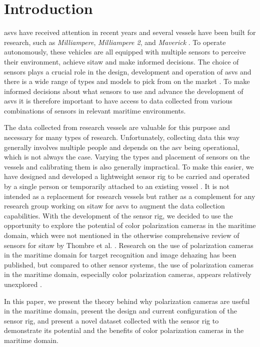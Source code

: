 \section{Introduction}
\glspl{asv} have received attention in recent years and several vessels have been built for research, such as \textit{Milliampere}, \textit{Milliampere 2}, and \textit{Maverick} \cite{brekkeMilliAmpereAutonomousFerry2022}\cite{zhangDesignBuildAutonomous2023}\cite{eideAutonomousUrbanPassengerInReview}.
To operate autonomously, these vehicles are all equipped with multiple sensors to perceive their environment, achieve \gls{sitaw} and make informed decisions.
The choice of sensors plays a crucial role in the design, development and operation of \glspl{asv} and there is a wide range of types and models to pick from on the market \cite{thombreSensorsAITechniques2022}.
To make informed decisions about what sensors to use and advance the development of \glspl{asv} it is therefore important to have access to data collected from various combinations of sensors in relevant maritime environments.

The data collected from research vessels are valuable for this purpose and necessary for many types of research.
Unfortunately, collecting data this way generally involves multiple people and depends on the \gls{asv} being operational, which is not always the case.
Varying the types and placement of sensors on the vessels and calibrating them is also generally impractical.
To make this easier, we have designed and developed a lightweight sensor rig to be carried and operated by a single person or temporarily attached to an existing vessel \cite{martensPavingWayEnhanced2023}.
It is not intended as a replacement for research vessels but rather as a complement for any research group working on \gls{sitaw} for \glspl{asv} to augment the data collection capabilities.
With the development of the sensor rig, we decided to use the opportunity to explore the potential of color polarization cameras in the maritime domain, which were not mentioned in the otherwise comprehensive review of sensors for \gls{sitaw} by Thombre et al. \cite{thombreSensorsAITechniques2022}.
Research on the use of polarization cameras in the maritime domain for target recognition and image dehazing has been published, but compared to other sensor systems, the use of polarization cameras in the maritime domain, especially color polarization cameras, appears relatively unexplored \cite{zhongPolarizationintensityJointImaging2023}\cite{maPolarizationBasedMethodMaritime2024}.

In this paper, we present the theory behind why polarization cameras are useful in the maritime domain, present the design and current configuration of the sensor rig, and present a novel dataset collected with the sensor rig to demonstrate its potential and the benefits of color polarization cameras in the maritime domain.

